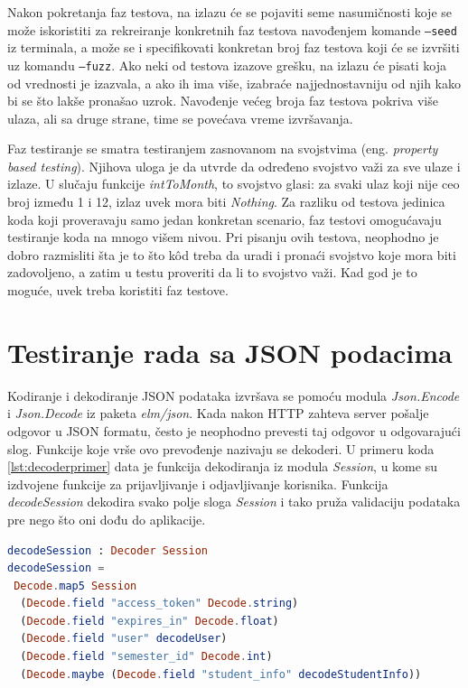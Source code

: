 \documentclass[12pt,oneside]{memoir}
\begin{document}
\par Nakon pokretanja faz testova, na izlazu će se pojaviti seme nasumičnosti koje se može iskoristiti za rekreiranje konkretnih faz testova navođenjem komande \texttt{---seed} iz terminala, a može se i specifikovati konkretan broj faz testova koji će se izvršiti uz komandu \texttt{---fuzz}. Ako neki od testova izazove grešku, na izlazu će pisati koja od vrednosti je izazvala, a ako ih ima više, izabraće najjednostavniju od njih kako bi se što lakše pronašao uzrok. Navođenje većeg broja faz testova pokriva više ulaza, ali sa druge strane, time se povećava vreme izvršavanja. 
\par Faz testiranje se smatra testiranjem zasnovanom na svojstvima (eng. \emph{property based testing}). Njihova uloga je da utvrde da određeno svojstvo važi za sve ulaze i izlaze. U slučaju funkcije \emph{intToMonth}, to svojstvo glasi: za svaki ulaz koji nije ceo broj između 1 i 12, izlaz uvek mora biti \emph{Nothing}. Za razliku od testova jedinica koda koji proveravaju samo jedan konkretan scenario, faz testovi omogućavaju testiranje koda na mnogo višem nivou. Pri pisanju ovih testova, neophodno je dobro razmisliti šta je to što k\^{o}d treba da uradi i pronaći svojstvo koje mora biti zadovoljeno, a zatim u testu proveriti da li to svojstvo važi. Kad god je to moguće, uvek treba koristiti faz testove. 

\section{Testiranje rada sa JSON podacima}
\par Kodiranje i dekodiranje JSON podataka izvršava se pomoću modula \emph{Json.Encode} i \emph{Json.Decode} iz paketa \emph{elm/json}. Kada nakon HTTP zahteva server pošalje odgovor u JSON formatu, često je neophodno prevesti taj odgovor u odgovarajući slog. Funkcije koje vrše ovo prevođenje nazivaju se dekoderi. U primeru koda \ref{lst:decoderprimer} data je funkcija dekodiranja iz modula \emph{Session}, u kome su izdvojene funkcije za prijavljivanje i odjavljivanje korisnika. Funkcija \emph{decodeSession} dekodira svako polje sloga \emph{Session} i tako pruža validaciju podataka pre nego što oni dođu do aplikacije. 

\begin{minipage}{\linewidth}
\begin{lstlisting}[language=elm, basicstyle=\small, caption={Implementacija funkcije dekodiranja \emph{decodeSession}},captionpos=b, label={lst:decoderprimer}]
decodeSession : Decoder Session
decodeSession =
 Decode.map5 Session
  (Decode.field "access_token" Decode.string)
  (Decode.field "expires_in" Decode.float)
  (Decode.field "user" decodeUser)
  (Decode.field "semester_id" Decode.int)
  (Decode.maybe (Decode.field "student_info" decodeStudentInfo))
\end{lstlisting}
\end{minipage}
\end{document}
